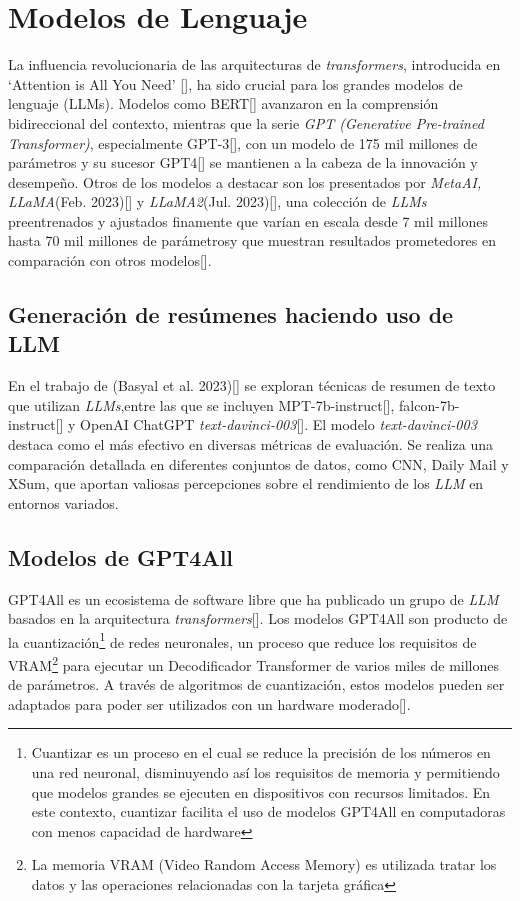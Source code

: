 \section{Modelos de Lenguaje}
   
    La influencia revolucionaria de las arquitecturas de \emph{transformers}, introducida en `Attention is All You Need' [\cite{attention}], ha sido crucial para los grandes modelos de lenguaje (LLMs). Modelos como BERT[\cite{BERT}] avanzaron en la comprensión bidireccional del contexto, mientras que la serie \emph{GPT (Generative Pre-trained Transformer)}, especialmente GPT-3[\cite{brown2020language}], con un modelo de 175 mil millones de parámetros y su sucesor GPT4[\cite{openai2023gpt4}] se mantienen a la cabeza de la innovación y desempeño. Otros de los modelos a destacar son los presentados por \emph{MetaAI, LLaMA}(Feb. 2023)[\cite{llamapaper}] y \emph{LLaMA2}(Jul. 2023)[\cite{llamapaper2}], una colección de \emph{LLMs} preentrenados y ajustados finamente que varían en escala desde 7 mil millones hasta 70 mil millones de parámetrosy que muestran resultados prometedores en comparación con otros modelos[\cite{metallama}]. 
    
    \subsection{Generación de resúmenes haciendo uso de LLM}

    En el trabajo de (Basyal et al. 2023)[\cite{basyal2023text}] se exploran técnicas de resumen de texto que utilizan \emph{LLMs},entre las que se incluyen MPT-7b-instruct[\cite{mpt}], falcon-7b-instruct[\cite{falcon}] y OpenAI ChatGPT \emph{text-davinci-003}[\cite{brown2020language}]. El modelo \emph{text-davinci-003} destaca como el más efectivo en diversas métricas de evaluación. Se realiza una comparación detallada en diferentes conjuntos de datos, como CNN, Daily Mail y XSum, que aportan valiosas percepciones sobre el rendimiento de los \emph{LLM} en entornos variados. 

    \subsection{Modelos de GPT4All}

        GPT4All es un ecosistema de software libre que ha publicado un grupo de \emph{LLM} basados en la arquitectura \emph{transformers}[\cite{attention}]. Los modelos GPT4All son producto de la cuantización\footnote{Cuantizar es un proceso en el cual se reduce la precisión de los números en una red neuronal, disminuyendo así los requisitos de memoria y permitiendo que modelos grandes se ejecuten en dispositivos con recursos limitados. En este contexto, cuantizar facilita el uso de modelos GPT4All en computadoras con menos capacidad de hardware} de redes neuronales, un proceso que reduce los requisitos de VRAM\footnote{La memoria VRAM (Video Random Access Memory) es utilizada tratar los datos y las operaciones relacionadas con la tarjeta gráfica} para ejecutar un Decodificador Transformer de varios miles de millones de parámetros. A través de algoritmos de cuantización, estos modelos pueden ser adaptados para poder ser utilizados con un hardware moderado[\cite{webgpt4all}].
        

